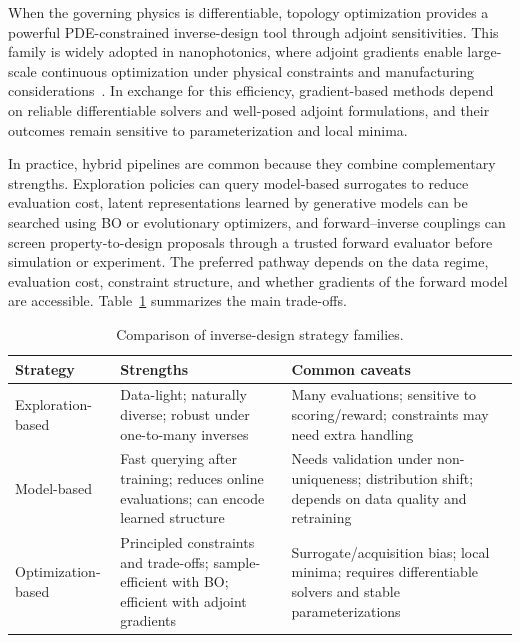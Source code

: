 When the governing physics is differentiable, topology optimization provides a powerful PDE-constrained inverse-design tool through adjoint sensitivities. This family is widely adopted in nanophotonics, where adjoint gradients enable large-scale continuous optimization under physical constraints and manufacturing considerations~\cite{Christiansen2021_JOSAB,Jensen2011_LPR}. In exchange for this efficiency, gradient-based methods depend on reliable differentiable solvers and well-posed adjoint formulations, and their outcomes remain sensitive to parameterization and local minima.




In practice, hybrid pipelines are common because they combine complementary strengths. Exploration policies can query model-based surrogates to reduce evaluation cost, latent representations learned by generative models can be searched using BO or evolutionary optimizers, and forward--inverse couplings can screen property-to-design proposals through a trusted forward evaluator before simulation or experiment. The preferred pathway depends on the data regime, evaluation cost, constraint structure, and whether gradients of the forward model are accessible. Table~\ref{tab:inv_compare} summarizes the main trade-offs.

\begin{table}[!htbp]
\centering
\caption{Comparison of inverse-design strategy families.}
\label{tab:inv_compare}
\setlength{\tabcolsep}{5pt}
\renewcommand{\arraystretch}{1.12}
\footnotesize
\begin{tabularx}{\linewidth}{
  >{\raggedright\arraybackslash}p{3.1cm}
  >{\raggedright\arraybackslash}X
  >{\raggedright\arraybackslash}X}
\toprule
\textbf{Strategy} & \textbf{Strengths} & \textbf{Common caveats} \\
\midrule
Exploration-based
& Data-light; naturally diverse; robust under one-to-many inverses
& Many evaluations; sensitive to scoring/reward; constraints may need extra handling \\
\addlinespace[2pt]
Model-based
& Fast querying after training; reduces online evaluations; can encode learned structure
& Needs validation under non-uniqueness; distribution shift; depends on data quality and retraining \\
\addlinespace[2pt]
Optimization-based
& Principled constraints and trade-offs; sample-efficient with BO; efficient with adjoint gradients
& Surrogate/acquisition bias; local minima; requires differentiable solvers and stable parameterizations \\
\bottomrule
\end{tabularx}
\end{table}




